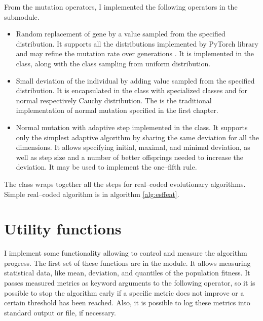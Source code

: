 From the mutation operators, I implemented the following operators in the  submodule.
\begin{itemize}
    \item Random replacement of gene by a value sampled from the specified distribution. It supports all the distributions implemented by PyTorch library and may refine the mutation rate over generations \citep{PyTorchDoc}. It is implemented in the  class, along with the  class sampling from uniform distribution.
    \item Small deviation of the individual by adding value sampled from the specified distribution. It is encapsulated in the  class with specialized classes  and  for normal respectively Cauchy distribution. The  is the traditional implementation of normal mutation specified in the first chapter.
    \item Normal mutation with adaptive step implemented in the  class. It supports only the simplest adaptive algorithm by sharing the same deviation for all the dimensions. It allows specifying initial, maximal, and minimal deviation, as well as step size and a number of better offsprings needed to increase the deviation. It may be used to implement the one--fifth rule.
\end{itemize}

The  class wraps together all the steps for real--coded evolutionary algorithms. Simple real--coded algorithm is in algorithm \ref{alg:esffeat}.
    



\section{Utility functions}

I implement some functionality allowing to control and measure the algorithm progress. The first set of these functions are in the  module. It allows measuring statistical data, like mean, deviation, and quantiles of the population fitness. It passes measured metrics as keyword arguments to the following operator, so it is possible to stop the algorithm early if a specific metric does not improve or a certain threshold has been reached. Also, it is possible to log these metrics into standard output or file, if necessary.

